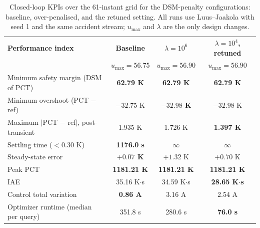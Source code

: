 \begin{table}[h!tb]
	\centering
	\caption{Closed-loop KPIs over the 61-instant grid for the DSM-penalty configurations: baseline, over-penalised, and the retuned setting. All runs use Luus--Jaakola with seed 1 and the same accident stream; $u_{\max}$ and $\lambda$ are the only design changes.}
	\label{tab:gbdt-penalty-kpis}
	\begin{tabular}{lccc}
		\toprule
		\textbf{Performance index} & \textbf{Baseline} & \textbf{$\lambda=10^{6}$} & \textbf{$\lambda=10^{4}$, retuned} \\
		 & $u_{\max}=56.75$ & $u_{\max}=56.90$ & $u_{\max}=56.90$ \\
		\midrule
		Minimum safety margin (DSM of PCT) & \textbf{62.79 K} & \textbf{62.79 K} & \textbf{62.79 K} \\
		Minimum overshoot (PCT $-$ ref) & $-32.75$ K & \textbf{$-32.98$ K} & $-32.98$ K \\
		Maximum $|$PCT $-$ ref$|$, post-transient & 1.935 K & 1.726 K & \textbf{1.397 K} \\
		Settling time ($<0.30$ K) & \textbf{1176.0 s} & $\infty$ & $\infty$ \\
		Steady-state error & \textbf{$+0.07$ K} & $+1.32$ K & $+0.70$ K \\
		Peak PCT & \textbf{1181.21 K} & \textbf{1181.21 K} & \textbf{1181.21 K} \\
		IAE & 35.16 K$\cdot$s & 34.59 K$\cdot$s & \textbf{28.65 K$\cdot$s} \\
		Control total variation & \textbf{0.86 A} & 3.16 A & 2.54 A \\
		Optimizer runtime (median per query) & 351.8 s & 280.6 s & \textbf{76.0 s} \\
		\bottomrule
	\end{tabular}
\end{table}